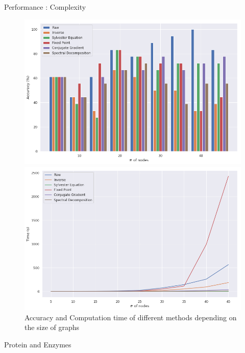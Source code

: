\documentclass[compress]{beamer}
\begin{document}
\begin{frame}{Performance : Complexity}
\begin{figure}[!htb]
	\begin{multicols}{2}
		\includegraphics[width=\linewidth]{data/nb_nodes/acc.png}\par
		\includegraphics[width=\linewidth]{data/nb_nodes/time.png}\par
	\end{multicols}
	\caption{Accuracy and Computation time of different methods depending on the size of graphs}
\end{figure}
\end{frame}
\begin{frame}{Protein and Enzymes}

\end{frame}
\end{document}

